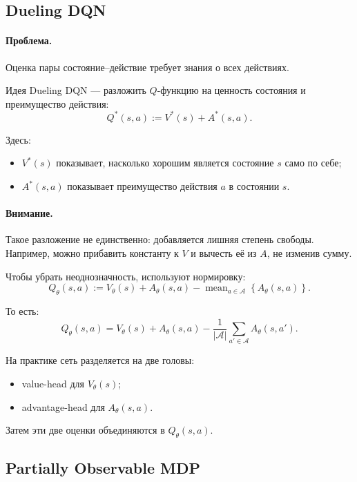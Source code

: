 \documentclass[12pt,a4paper]{article}
\begin{document}
\subsection{Dueling DQN}

\paragraph{Проблема.}

Оценка пары состояние--действие требует знания о всех действиях.

Идея Dueling DQN --- разложить $Q$-функцию на ценность состояния и преимущество действия:
\[
Q^\ast(s,a)
:=
V^\ast(s)
+
A^\ast(s,a).
\]

Здесь:
\begin{itemize}
    \item $V^\ast(s)$ показывает, насколько хорошим является состояние $s$ само по себе;
    \item $A^\ast(s,a)$ показывает преимущество действия $a$ в состоянии $s$.
\end{itemize}

\paragraph{Внимание.}

Такое разложение не единственно: добавляется лишняя степень свободы. Например, можно прибавить константу к $V$ и вычесть её из $A$, не изменив сумму.

Чтобы убрать неоднозначность, используют нормировку:
\[
Q_\theta(s,a)
:=
V_\theta(s)
+
A_\theta(s,a)
-
\operatorname{mean}_{a \in \mathcal A}
\left\{
A_\theta(s,a)
\right\}.
\]

То есть:
\[
Q_\theta(s,a)
=
V_\theta(s)
+
A_\theta(s,a)
-
\frac{1}{|\mathcal A|}
\sum_{a' \in \mathcal A}
A_\theta(s,a').
\]

На практике сеть разделяется на две головы:
\begin{itemize}
    \item value-head для $V_\theta(s)$;
    \item advantage-head для $A_\theta(s,a)$.
\end{itemize}

Затем эти две оценки объединяются в $Q_\theta(s,a)$.

\subsection{Partially Observable MDP}
\end{document}
